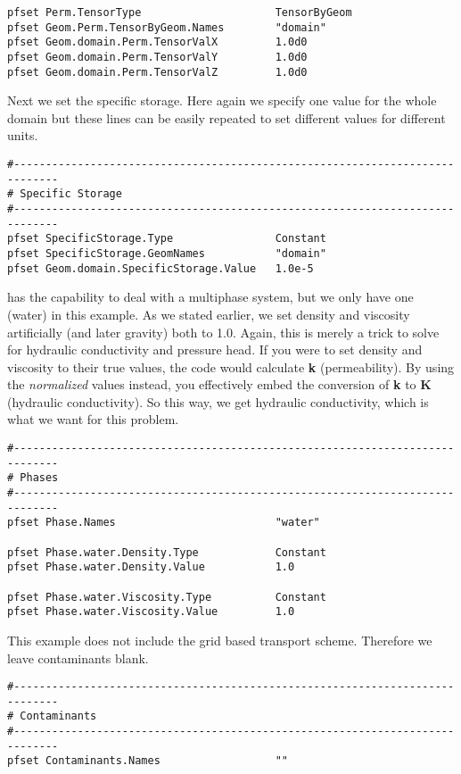 \begin{verbatim}
pfset Perm.TensorType                     TensorByGeom
pfset Geom.Perm.TensorByGeom.Names        "domain"
pfset Geom.domain.Perm.TensorValX         1.0d0
pfset Geom.domain.Perm.TensorValY         1.0d0
pfset Geom.domain.Perm.TensorValZ         1.0d0
\end{verbatim}

Next we set the specific storage. Here again we specify one value for the whole domain but
these lines can be easily repeated to set different values for different units. 

\begin{verbatim}
#-----------------------------------------------------------------------------
# Specific Storage
#-----------------------------------------------------------------------------
pfset SpecificStorage.Type                Constant
pfset SpecificStorage.GeomNames           "domain"
pfset Geom.domain.SpecificStorage.Value   1.0e-5
\end{verbatim}

\parflow{} has the capability to deal with a multiphase system, but we only have one (water) in this example. 
As we stated earlier, we set density and viscosity artificially (and later gravity) both to 1.0.  
Again, this is merely a trick to solve for hydraulic conductivity and pressure head.  
If you were to set density and viscosity to their true values, the code would calculate {\bf k} (permeability). 
By using the \emph{normalized} values instead, you effectively embed the conversion of {\bf k} to {\bf K} (hydraulic conductivity). 
So this way, we get hydraulic conductivity, which is what we want for this problem.

\begin{verbatim}
#-----------------------------------------------------------------------------
# Phases
#-----------------------------------------------------------------------------
pfset Phase.Names                         "water"

pfset Phase.water.Density.Type            Constant
pfset Phase.water.Density.Value           1.0

pfset Phase.water.Viscosity.Type          Constant
pfset Phase.water.Viscosity.Value         1.0
\end{verbatim}

This example does not include the \parflow{} grid based transport scheme.  Therefore we leave 
contaminants blank.

\begin{verbatim}
#-----------------------------------------------------------------------------
# Contaminants
#-----------------------------------------------------------------------------
pfset Contaminants.Names                  ""
\end{verbatim}

